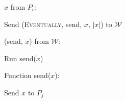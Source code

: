 \begin{bbox}[title={$\mathcal{F}_\mathsf{async}^{P_i, P_j}$}]

\OnInput $x$ from $P_i$:

	\quad Send (\textsc{Eventually}, \textsf{send}, $x$, $|x|$) to $\mathcal{W}$
	
\OnInput (\textsf{send}, $x$) from $\mathcal{W}$:

	\quad Run \textsf{send}($x$)
	
Function \textsf{send}($x$):

	\quad Send $x$ to $P_j$
\end{bbox}
